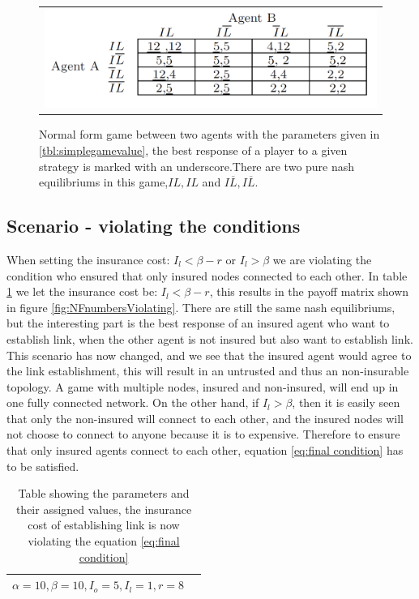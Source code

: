 \begin{figure}[h]
\centering
\begin{tabular}{@{}c@{}}
\includegraphics[width=1.0\textwidth]{../Figures/gameTheoryModel1WithNumbers.png}
\end{tabular}
\caption[Caption for LOF]{Normal form game between two agents with the parameters given in \ref{tbl:simplegamevalue}, the best response of a player to a given strategy is marked with an underscore.There are two pure nash equilibriums in this game,$IL,IL$ and $I\overline{L},I\overline{L}$. \label{fig:NFnumbers}}
\end{figure}

\subsection{Scenario - violating the conditions}
When setting the insurance cost: $I_{l}<\beta - r$ or $I_{l}>\beta$ we are violating the condition who ensured that only insured nodes connected to each other. In table \ref{tbl:simplegamevalue2} we let the insurance cost be: $I_{l}<\beta - r$, this results in the payoff matrix shown in figure \ref{fig:NFnumbersViolating}. There are still the same nash equilibriums, but the interesting part is the best response of an insured agent who want to establish link, when the other agent is not insured but also want to establish link. This scenario has now changed, and we see that the insured agent would agree to the link establishment, this will result in an untrusted and thus an non-insurable topology. A game with multiple nodes, insured and non-insured, will end up in one fully connected network.
On the other hand, if $I_{l}>\beta$, then it is easily seen that only the non-insured will connect to each other, and the insured nodes will not choose to connect to anyone because it is to expensive.
 Therefore to ensure that only insured agents connect to each other, equation \ref{eq:final condition} has to be satisfied. 
\begin{table}[h]
\centering
\begin{tabular}{lc}
 \hline
  $\alpha=10,
  \beta=10,
  I_{o}=5,
  I_{l}=1,
  r=8$\\
  \hline
\end{tabular}
\caption{Table showing the parameters and their assigned values, the insurance cost of establishing link is now violating the equation \ref{eq:final condition} \label{tbl:simplegamevalue2}}
\end{table}

